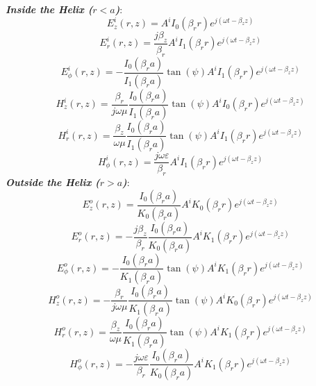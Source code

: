 \hspace*{2em} \textit{\textbf{Inside the Helix ($r<a$)}}:
\begin{equation}\label{eq:Ez_ins2}
	E_{z}^{i}(r,z) = A^{i}I_{0}(\beta_{r}r)e^{j(\omega t - \beta_{z}z)}
\end{equation}
\begin{equation}\label{eq:Er_ins2}
	E_r^i(r,z) = \frac{j\beta_z}{\beta_r} A^i  I_1(\beta_r r) e^{j(\omega t - \beta_z z)}
\end{equation}
\begin{equation}\label{eq:Ephi_ins2}
	E_\phi^i(r,z) = -\frac{I_{0}(\beta_{r}a)}{I_{1}(\beta_{r}a)}\tan(\psi) A^i I_1(\beta_r r) e^{j(\omega t - \beta_z z)}
\end{equation}
\begin{equation}\label{eq:Hz_ins2}
	H_{z}^{i}(r,z) = \frac{\beta_{r}}{j\omega\mu}\frac{I_{0}(\beta_{r}a)}{I_{1}(\beta_{r}a)} \tan(\psi) A^i I_{0}(\beta_{r}r)e^{j(\omega t - \beta_{z}z)}
\end{equation}
\begin{equation}\label{eq:Hr_ins2}
	H_r^i(r,z) = \frac{\beta_{z}}{\omega\mu}\frac{I_{0}(\beta_{r}a)}{I_{1}(\beta_{r}a)} \tan(\psi) A^i I_{1}(\beta_{r}r)e^{j(\omega t - \beta_{z}z)}
\end{equation}
\begin{equation}\label{eq:Hphi_ins2}
	H_\phi^i(r,z) = \frac{j \omega \varepsilon}{\beta_r} A^i I_1(\beta_r r) e^{j(\omega t - \beta_z z)}
\end{equation}
\hspace*{2em} \textit{\textbf{Outside the Helix ($r>a$)}}:
\begin{equation}\label{eq:Ez_out2}
	E_{z}^{o}(r,z) = \frac{I_{0}(\beta_{r}a)}{K_{0}(\beta_{r}a)} A^i K_{0}(\beta_{r}r)e^{j(\omega t - \beta_{z}z)}
\end{equation}
\begin{equation}\label{eq:Er_out2}
	E_r^o(r,z) = -\frac{j\beta_{z}}{\beta_{r}}\frac{I_{0}(\beta_{r}a)}{K_{0}(\beta_{r}a)} A^i K_{1}(\beta_{r}r)e^{j(\omega t - \beta_{z}z)}
\end{equation}
\begin{equation}\label{eq:Ephi_out2}
	E_\phi^o(r,z) = -\frac{I_{0}(\beta_{r}a)}{K_{1}(\beta_{r}a)} \tan(\psi) A^i K_{1}(\beta_{r}r)e^{j(\omega t - \beta_{z}z)}
\end{equation}
\begin{equation}\label{eq:Hz_out2}
	H_{z}^{o}(r,z) = -\frac{\beta_{r}}{j\omega\mu}\frac{I_{0}(\beta_{r}a)}{K_{1}(\beta_{r}a)} \tan(\psi) A^i K_{0}(\beta_{r}r)e^{j(\omega t - \beta_{z}z)}
\end{equation}
\begin{equation}\label{eq:Hr_out2}
	H_r^o(r,z) = \frac{\beta_{z}}{\omega\mu}\frac{I_{0}(\beta_{r}a)}{K_{1}(\beta_{r}a)} \tan(\psi) A^i K_{1}(\beta_{r}r)e^{j(\omega t - \beta_{z}z)}
\end{equation}
\begin{equation}\label{eq:Hphi_out2}
	H_\phi^o(r,z) =  -\frac{j\omega\varepsilon}{\beta_{r}}\frac{I_{0}(\beta_{r}a)}{K_{0}(\beta_{r}a)} A^i K_{1}(\beta_{r}r)e^{j(\omega t - \beta_{z}z)}
\end{equation}

